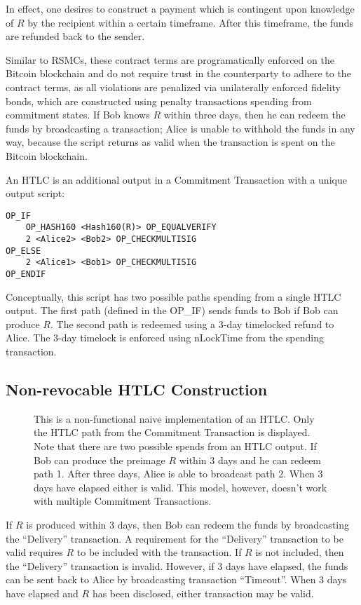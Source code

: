 \documentclass[letterpaper,11pt]{article}
\begin{document}
In effect, one desires to construct a payment which is contingent upon knowledge
of $R$ by the recipient within a certain timeframe. After this timeframe, the
funds are refunded back to the sender.

Similar to RSMCs, these contract terms are programatically enforced on the
Bitcoin blockchain and do not require trust in the counterparty to adhere to the
contract terms, as all violations are penalized via unilaterally enforced
fidelity bonds, which are constructed using penalty transactions spending from
commitment states. If Bob knows $R$ within three days, then he can redeem the
funds by broadcasting a transaction; Alice is unable to withhold the funds in
any way, because the script returns as valid when the transaction is spent on
the Bitcoin blockchain.

An HTLC is an additional output in a Commitment Transaction with a unique
output script:

\begin{lstlisting}
OP_IF 
	OP_HASH160 <Hash160(R)> OP_EQUALVERIFY
	2 <Alice2> <Bob2> OP_CHECKMULTISIG
OP_ELSE 
	2 <Alice1> <Bob1> OP_CHECKMULTISIG
OP_ENDIF
\end{lstlisting}

Conceptually, this script has two possible paths spending from a single HTLC
output. The first path (defined in the OP\_IF) sends funds to Bob if Bob can
produce $R$. The second path is redeemed using a 3-day timelocked refund to
Alice. The 3-day timelock is enforced using nLockTime from the spending
transaction.

\subsection{Non-revocable HTLC Construction}

\begin{figure}[H]
	\caption{This is a non-functional naive implementation of an HTLC. Only
		the HTLC path from the Commitment Transaction is displayed. Note
		that there are two possible spends from an HTLC output. If Bob
		can produce the preimage $R$ within 3 days and he can redeem
		path 1. After three days, Alice is able to broadcast path 2.
		When 3 days have elapsed either is valid. This model, however,
		doesn't work with multiple Commitment Transactions.
	}
\end{figure}

If $R$ is produced within 3 days, then Bob can redeem the funds by broadcasting
the ``Delivery'' transaction. A requirement for the ``Delivery'' transaction to
be valid requires $R$ to be included with the transaction. If $R$ is not
included, then the ``Delivery'' transaction is invalid. However, if 3 days have
elapsed, the funds can be sent back to Alice by broadcasting transaction
``Timeout''. When 3 days have elapsed and $R$ has been disclosed, either
transaction may be valid.
\end{document}
